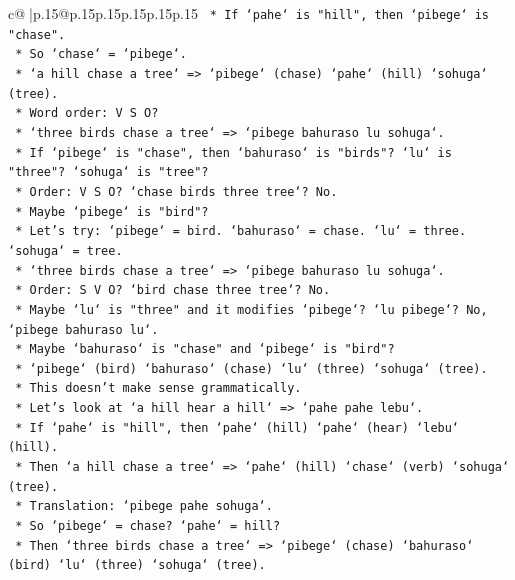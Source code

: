 \documentclass{article}
\begin{document}
{\begin{supertabular}{c@{$\;$}|p{.15\linewidth}@{}p{.15\linewidth}p{.15\linewidth}p{.15\linewidth}p{.15\linewidth}p{.15\linewidth}}
{{{\texttt{            *   If `pahe` is "hill", then `pibege` is "chase".} \\
\texttt{            *   So `chase` = `pibege`.} \\
\texttt{            *   `a hill chase a tree` => `pibege` (chase) `pahe` (hill) `sohuga` (tree).} \\
\texttt{            *   Word order: V S O?} \\
\texttt{            *   `three birds chase a tree` => `pibege bahuraso lu sohuga`.} \\
\texttt{            *   If `pibege` is "chase", then `bahuraso` is "birds"? `lu` is "three"? `sohuga` is "tree"?} \\
\texttt{            *   Order: V S O? `chase birds three tree`? No.} \\
\texttt{            *   Maybe `pibege` is "bird"?} \\
\texttt{            *   Let's try: `pibege` = bird. `bahuraso` = chase. `lu` = three. `sohuga` = tree.} \\
\texttt{            *   `three birds chase a tree` => `pibege bahuraso lu sohuga`.} \\
\texttt{            *   Order: S V O? `bird chase three tree`? No.} \\
\texttt{            *   Maybe `lu` is "three" and it modifies `pibege`? `lu pibege`? No, `pibege bahuraso lu`.} \\
\texttt{            *   Maybe `bahuraso` is "chase" and `pibege` is "bird"?} \\
\texttt{            *   `pibege` (bird) `bahuraso` (chase) `lu` (three) `sohuga` (tree).} \\
\texttt{            *   This doesn't make sense grammatically.} \\
\texttt{            *   Let's look at `a hill hear a hill` => `pahe pahe lebu`.} \\
\texttt{            *   If `pahe` is "hill", then `pahe` (hill) `pahe` (hear) `lebu` (hill).} \\
\texttt{            *   Then `a hill chase a tree` => `pahe` (hill) `chase` (verb) `sohuga` (tree).} \\
\texttt{            *   Translation: `pibege pahe sohuga`.} \\
\texttt{            *   So `pibege` = chase? `pahe` = hill?} \\
\texttt{            *   Then `three birds chase a tree` => `pibege` (chase) `bahuraso` (bird) `lu` (three) `sohuga` (tree).} \\
}}}
\end{supertabular}}
\end{document}
